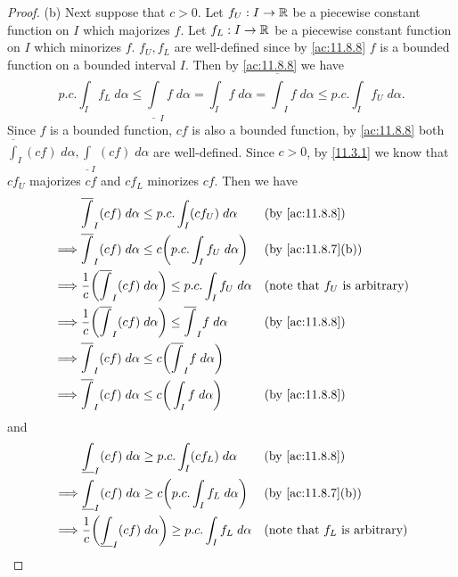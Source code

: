 \begin{proof}{(b)}
  Next suppose that \(c > 0\).
  Let \(f_U : I \to \mathbb{R}\) be a piecewise constant function on \(I\) which majorizes \(f\).
  Let \(f_L : I \to \mathbb{R}\) be a piecewise constant function on \(I\) which minorizes \(f\).
  \(f_U, f_L\) are well-defined since by \cref{ac:11.8.8} \(f\) is a bounded function on a bounded interval \(I\).
  Then by \cref{ac:11.8.8} we have
  \[
    p.c. \int_I f_L \; d \alpha \leq \underline{\int}_I f \; d \alpha = \int_I f \; d \alpha = \overline{\int}_I f \; d \alpha \leq p.c. \int_I f_U \; d \alpha.
  \]
  Since \(f\) is a bounded function, \(cf\) is also a bounded function, by \cref{ac:11.8.8} both \(\overline{\int}_I (cf) \; d \alpha, \underline{\int}_I (cf) \; d \alpha\) are well-defined.
  Since \(c > 0\), by \cref{11.3.1} we know that \(c f_U\) majorizes \(c f\) and \(c f_L\) minorizes \(c f\).
  Then we have
  \begin{align*}
             & \overline{\int}_I (cf) \; d \alpha \leq p.c. \int_I (c f_U) \; d \alpha                          &  & \text{(by \cref{ac:11.8.8})}            \\
    \implies & \overline{\int}_I (cf) \; d \alpha \leq c \bigg(p.c. \int_I f_U \; d \alpha\bigg)                &  & \text{(by \cref{ac:11.8.7}(b))}         \\
    \implies & \dfrac{1}{c} \bigg(\overline{\int}_I (cf) \; d \alpha\bigg) \leq p.c. \int_I f_U \; d \alpha     &  & \text{(note that \(f_U\) is arbitrary)} \\
    \implies & \dfrac{1}{c} \bigg(\overline{\int}_I (cf) \; d \alpha\bigg) \leq \overline{\int}_I f \; d \alpha &  & \text{(by \cref{ac:11.8.8})}            \\
    \implies & \overline{\int}_I (cf) \; d \alpha \leq c\bigg(\overline{\int}_I f \; d \alpha\bigg)                                                          \\
    \implies & \overline{\int}_I (cf) \; d \alpha \leq c\bigg(\int_I f \; d \alpha\bigg)                        &  & \text{(by \cref{ac:11.8.8})}
  \end{align*}
  and
  \begin{align*}
             & \underline{\int}_I (cf) \; d \alpha \geq p.c. \int_I (c f_L) \; d \alpha                           &  & \text{(by \cref{ac:11.8.8})}            \\
    \implies & \underline{\int}_I (cf) \; d \alpha \geq c \bigg(p.c. \int_I f_L \; d \alpha\bigg)                 &  & \text{(by \cref{ac:11.8.7}(b))}         \\
    \implies & \dfrac{1}{c} \bigg(\underline{\int}_I (cf) \; d \alpha\bigg) \geq p.c. \int_I f_L \; d \alpha      &  & \text{(note that \(f_L\) is arbitrary)} \\

\end{align*}
\end{proof}
